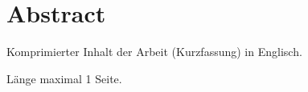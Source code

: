 
\chapter{Abstract}

Komprimierter Inhalt der Arbeit (Kurzfassung) in Englisch.

Länge maximal 1 Seite.



